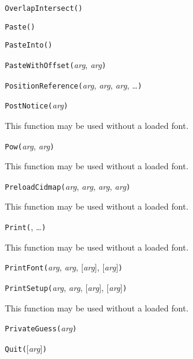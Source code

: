 
\noindent\texttt{OverlapIntersect(}\texttt{)}


\noindent\texttt{Paste(}\texttt{)}


\noindent\texttt{PasteInto(}\texttt{)}


\noindent\texttt{PasteWithOffset(}\textit{arg}, \textit{arg}\texttt{)}


\noindent\texttt{PositionReference(}\textit{arg}, \textit{arg}, \textit{arg}, \ldots\texttt{)}


\noindent\texttt{PostNotice(}\textit{arg}\texttt{)}

This function may be used without a loaded font.


\noindent\texttt{Pow(}\textit{arg}, \textit{arg}\texttt{)}

This function may be used without a loaded font.


\noindent\texttt{PreloadCidmap(}\textit{arg}, \textit{arg}, \textit{arg}, \textit{arg}\texttt{)}

This function may be used without a loaded font.


\noindent\texttt{Print(}, \ldots\texttt{)}

This function may be used without a loaded font.


\noindent\texttt{PrintFont(}\textit{arg}, \textit{arg}, [\textit{arg}], [\textit{arg}]\texttt{)}


\noindent\texttt{PrintSetup(}\textit{arg}, \textit{arg}, [\textit{arg}], [\textit{arg}]\texttt{)}

This function may be used without a loaded font.


\noindent\texttt{PrivateGuess(}\textit{arg}\texttt{)}


\noindent\texttt{Quit(}[\textit{arg}]\texttt{)}

